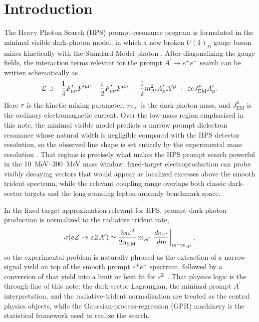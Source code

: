 \section{Introduction}
\label{sec:introduction}

The Heavy Photon Search (HPS) prompt-resonance program is formulated in the minimal
visible dark-photon model, in which a new broken $U(1)_D$ gauge boson mixes
kinetically with the Standard-Model photon \cite{Holdom1986,EssigEtAl2011}. After
diagonalizing the gauge fields, the interaction terms relevant for the prompt
$A^\prime \rightarrow e^+e^-$ search can be written schematically as
\begin{equation}
\mathcal{L}
\supset
-\frac{1}{4}F_{\mu\nu}^{\prime}F^{\prime\mu\nu}
-\frac{\varepsilon}{2}F_{\mu\nu}^{\prime}F^{\mu\nu}
\,+\,\frac{1}{2}m_{A^\prime}^{2}A_\mu^\prime A^{\prime\mu}
\,+\,\varepsilon e J_{\mathrm{EM}}^\mu A_\mu^\prime .
\label{eq:dark-photon-lagrangian}
\end{equation}
Here $\varepsilon$ is the kinetic-mixing parameter, $m_{A^\prime}$ is the dark-photon mass,
and $J_{\mathrm{EM}}^\mu$ is the ordinary electromagnetic current. Over the low-mass
region emphasized in this note, the minimal visible model predicts a narrow prompt
dielectron resonance whose natural width is negligible compared with the HPS detector
resolution, so the observed line shape is set entirely by the experimental mass
resolution \cite{HPS2015DarkPhoton,HPS2016PromptLong}. That regime is precisely what
makes the HPS prompt search powerful in the \SIrange{10}{300}{MeV} mass window:
fixed-target electroproduction can probe visibly decaying vectors that would appear as
localized excesses above the smooth trident spectrum, while the relevant coupling range
overlaps both classic dark-sector targets and the long-standing lepton-anomaly
benchmark space.

In the fixed-target approximation relevant for HPS, prompt dark-photon production is
normalized to the radiative trident rate,
\begin{equation}
\sigma(e Z \rightarrow e Z A^\prime)
\simeq
\frac{3\pi \varepsilon^2}{2\alpha_{\mathrm{EM}}}\,
m_{A^\prime}\,
\left.\frac{d\sigma_{\gamma^\ast}}{dm}\right|_{m=m_{A^\prime}},
\label{eq:ap-production}
\end{equation}
so the experimental problem is naturally phrased as the extraction of a narrow signal
yield on top of the smooth prompt $e^+e^-$ spectrum, followed by a conversion of that
yield into a limit or best fit for $\varepsilon^2$
\cite{EssigEtAl2011,HPS2015DarkPhoton,HPS2016PromptLong}. That physics logic is the
through-line of this note: the dark-sector Lagrangian, the minimal prompt $A^\prime$
interpretation, and the radiative-trident normalization are treated as the central
physics objects, while the Gaussian-process-regression (GPR) machinery is the
statistical framework used to realize the search.

